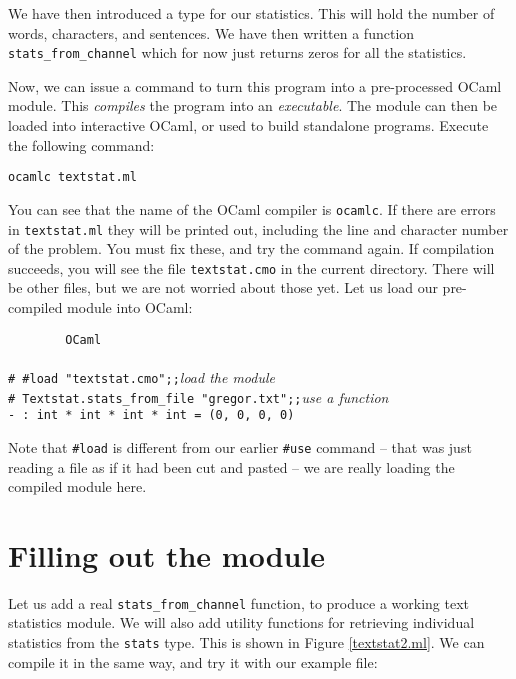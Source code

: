 \documentclass[]{book}
\newcommand{\smspace}{\vspace{4mm}}
\begin{document}
We have then introduced a type for our statistics. This will hold the number of words, characters, and sentences. We have then written a function \texttt{stats\_from\_channel} which for now just returns zeros for all the statistics.

Now, we can issue a command to turn this program into a pre-processed OCaml module. This \textit{compiles} the program into an \textit{executable}. The module can then be loaded into interactive OCaml, or used to build standalone programs. Execute the following command:

\smspace
\texttt{ocamlc textstat.ml}
\smspace

\noindent You can see that the name of the OCaml compiler is \texttt{ocamlc}. If there are errors in \texttt{textstat.ml} they will be printed out, including the line and character number of the problem. You must fix these, and try the command again. If compilation succeeds, you will see the file \texttt{textstat.cmo} in the current directory. There will be other files, but we are not worried about those yet. Let us load our pre-compiled module into OCaml:

\smspace
\noindent\verb!        OCaml!\\
\noindent\\
\noindent\texttt{\# \#load "textstat.cmo";;}\hfill\textit{load the module}\\
\noindent\texttt{\# Textstat.stats\_from\_file "gregor.txt";;}\hfill\textit{use a function}\\
\noindent\texttt{- :\ int * int * int * int = (0, 0, 0, 0)}\hfill\vphantom{g}
\smspace

\noindent Note that \texttt{\#load} is different from our earlier \texttt{\#use} command -- that was just reading a file as if it had been cut and pasted -- we are really loading the compiled module here.

\section*{Filling out the module}

Let us add a real \texttt{stats\_from\_channel} function, to produce a working text statistics module. We will also add utility functions for retrieving individual statistics from the \texttt{stats} type. This is shown in Figure \ref{textstat2.ml}. We can compile it in the same way, and try it with our example file:
\end{document}
